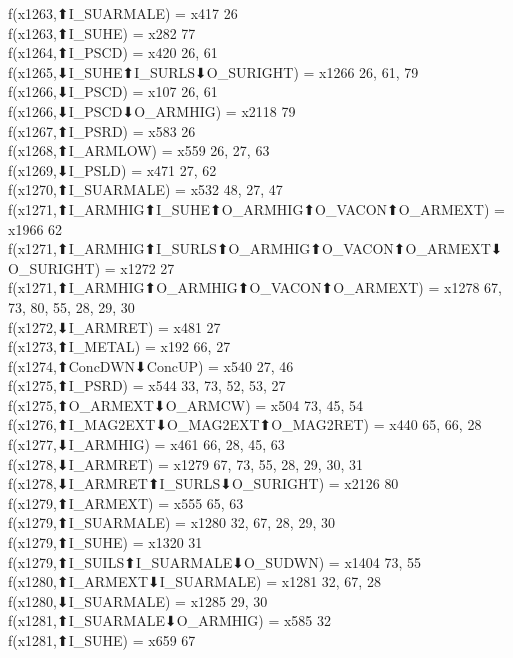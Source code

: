 f(x1263,⬆I_SUARMALE) = x417 {26} \\
f(x1263,⬆I_SUHE) = x282 {77} \\
f(x1264,⬆I_PSCD) = x420 {26, 61} \\
f(x1265,⬇I_SUHE⬆I_SURLS⬇O_SURIGHT) = x1266 {26, 61, 79} \\
f(x1266,⬇I_PSCD) = x107 {26, 61} \\
f(x1266,⬇I_PSCD⬇O_ARMHIG) = x2118 {79} \\
f(x1267,⬆I_PSRD) = x583 {26} \\
f(x1268,⬆I_ARMLOW) = x559 {26, 27, 63} \\
f(x1269,⬇I_PSLD) = x471 {27, 62} \\
f(x1270,⬆I_SUARMALE) = x532 {48, 27, 47} \\
f(x1271,⬆I_ARMHIG⬆I_SUHE⬆O_ARMHIG⬆O_VACON⬆O_ARMEXT) = x1966 {62} \\
f(x1271,⬆I_ARMHIG⬆I_SURLS⬆O_ARMHIG⬆O_VACON⬆O_ARMEXT⬇O_SURIGHT) = x1272 {27} \\
f(x1271,⬆I_ARMHIG⬆O_ARMHIG⬆O_VACON⬆O_ARMEXT) = x1278 {67, 73, 80, 55, 28, 29, 30} \\
f(x1272,⬇I_ARMRET) = x481 {27} \\
f(x1273,⬆I_METAL) = x192 {66, 27} \\
f(x1274,⬆ConcDWN⬇ConcUP) = x540 {27, 46} \\
f(x1275,⬆I_PSRD) = x544 {33, 73, 52, 53, 27} \\
f(x1275,⬆O_ARMEXT⬇O_ARMCW) = x504 {73, 45, 54} \\
f(x1276,⬆I_MAG2EXT⬇O_MAG2EXT⬆O_MAG2RET) = x440 {65, 66, 28} \\
f(x1277,⬇I_ARMHIG) = x461 {66, 28, 45, 63} \\
f(x1278,⬇I_ARMRET) = x1279 {67, 73, 55, 28, 29, 30, 31} \\
f(x1278,⬇I_ARMRET⬆I_SURLS⬇O_SURIGHT) = x2126 {80} \\
f(x1279,⬆I_ARMEXT) = x555 {65, 63} \\
f(x1279,⬆I_SUARMALE) = x1280 {32, 67, 28, 29, 30} \\
f(x1279,⬆I_SUHE) = x1320 {31} \\
f(x1279,⬆I_SUILS⬆I_SUARMALE⬇O_SUDWN) = x1404 {73, 55} \\
f(x1280,⬆I_ARMEXT⬇I_SUARMALE) = x1281 {32, 67, 28} \\
f(x1280,⬇I_SUARMALE) = x1285 {29, 30} \\
f(x1281,⬆I_SUARMALE⬇O_ARMHIG) = x585 {32} \\
f(x1281,⬆I_SUHE) = x659 {67} \\
